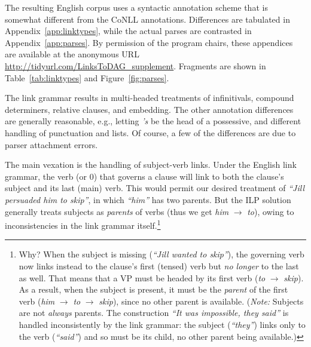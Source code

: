 \documentclass[a4paper,11pt]{article}
\begin{document}
The resulting English corpus uses a syntactic annotation scheme that is somewhat different from the CoNLL annotations.  Differences are tabulated in
Appendix~\ref{app:linktypes}, while the actual parses are contrasted in Appendix~\ref{app:parses}.  
By permission of the program chairs, these appendices are available at the anonymous URL \url{http://tidyurl.com/LinksToDAG_supplement}.  
Fragments are shown in Table~\ref{tab:linktypes} and Figure~\ref{fig:parses}.

The link grammar results in multi-headed treatments of infinitivals, compound determiners, relative clauses, and embedding.  The other annotation differences are generally reasonable, e.g., letting {\em 's} be the head of a possessive, and different handling of punctuation and lists.  Of course, a few of the differences are due to parser attachment errors.

The main vexation is the handling of subject-verb links.  Under the English link grammar, the verb (or 0) that governs a clause will link to both the clause's subject and its last (main) verb.  This would permit our desired treatment of {\em ``Jill persuaded him to skip''}, in which {\em ``him''} has two parents.  But the ILP solution generally treats subjects as {\em parents} of verbs (thus we get {\em him} $\rightarrow$ {\em to}), owing to inconsistencies in the link grammar itself.\footnote{Why?  When the subject is missing ({\em ``Jill wanted to skip''}), the governing verb now links instead to the clause's first (tensed) verb but {\em no longer} to the last as well.  That means that a VP must be headed by its first verb ({\em to} $\rightarrow$ {\em skip}).  As a result, when the subject is present, it must be the {\em parent} of the first verb ({\em him} $\rightarrow$ {\em to} $\rightarrow$ {\em skip}), since no other parent is available.  ({\em Note:} Subjects are not {\em always} parents.  The construction {\em ``It was impossible, they said''} is handled inconsistently by the link grammar:
the subject ({\em ``they''}) links only to the verb ({\em ``said''}) and so must be its child, no other parent being available.)}


\end{document}
